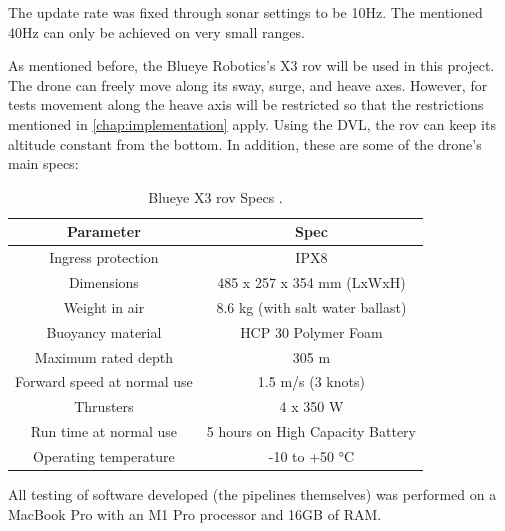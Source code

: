 The update rate was fixed through sonar settings to be 10Hz. The mentioned 40Hz can only be achieved on very small ranges. 

As mentioned before, the Blueye Robotics's X3 \acrshort{rov} will be used in this project. The drone can freely move along its sway, surge, and heave axes. However, for tests movement along the heave axis will be restricted so that the restrictions mentioned in \autoref{chap:implementation} apply. Using the DVL, the \acrshort{rov} can keep its altitude constant from the bottom. In addition, these are some of the drone's main specs:

\begin{table}[H]
    \centering
    \begin{tabular}{|c|c|}
        \hline
        \textbf{Parameter} & \textbf{Spec} \\ \hline
        Ingress protection & IPX8 \\ \hline
        Dimensions & 485 x 257 x 354 mm (LxWxH) \\ \hline
        Weight in air & 8.6 kg (with salt water ballast) \\ \hline
        Buoyancy material & HCP 30 Polymer Foam \\ \hline
        Maximum rated depth & 305 m \\ \hline
        Forward speed at normal use & 1.5 m/s (3 knots) \\ \hline
        Thrusters & 4 x 350 W \\ \hline
        Run time at normal use & 5 hours on High Capacity Battery \\ \hline
        Operating temperature & -10 to +50 °C \\ \hline
    \end{tabular}
    \caption{Blueye X3 \acrshort{rov} Specs \cite{Blueye:X3Specs}.}
    \label{tab:drone_specs}
\end{table}

All testing of software developed (the pipelines themselves) was performed on a MacBook Pro with an M1 Pro processor and 16GB of RAM.

